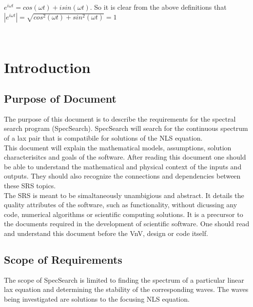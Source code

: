 \documentclass[12pt]{article}
\begin{document}
$ e^{i \omega t} = cos(\omega t) + i sin(\omega t)$. So it is clear from the 
above definitions that \\$ |e^{i \omega t}| = \sqrt{cos^{2} (\omega t) + 
sin^{2} (\omega t)} = 1$ \\ 


\tableofcontents

~\newpage


\section{Introduction}

\subsection{Purpose of Document}
The purpose of this document is to describe the requirements for the spectral 
search program (SpecSearch). SpecSearch will search for the 
continuous spectrum of a lax pair that is compatibile for solutions 
of the NLS 
equation. \\ 

This document will explain the mathematical models, assumptions, 
solution characterisitcs and goals of the software. After reading this document 
one should be able to understand the mathematical and physical context of the 
inputs and outputs. They should also recognize the connections and 
dependencies between these SRS topics. \\

The SRS is meant to be simaltaneously unambigious and abstract. It details the 
quality attributes of the software, such as functionality, 
without dicussing any code, numerical algorithms or scientific computing 
solutions. It is a precursor to the documents required in the development of 
scientific software. One should read and understand this document before the 
VnV, design or code itself. \\


\subsection{Scope of Requirements} 

The scope of SpecSearch is limited to finding the spectrum of a particular 
linear lax equation and determining the stability of the corresponding waves. 
The waves being investigated are solutions to 
the focusing NLS equation. 
\end{document}
